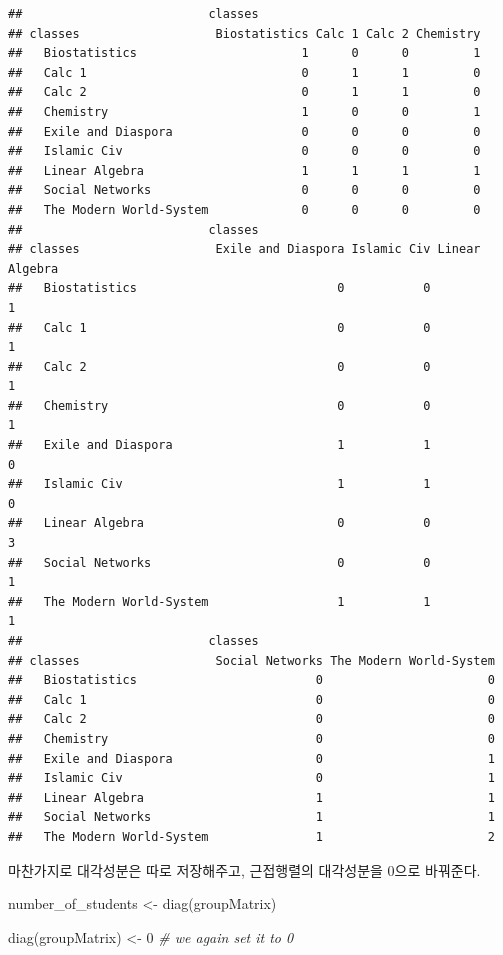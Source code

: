 \documentclass[
]{book}
\newenvironment{Shaded}{\begin{snugshade}}{\end{snugshade}}
\newcommand{\CommentTok}[1]{\textcolor[rgb]{0.56,0.35,0.01}{\textit{#1}}}
\newcommand{\DecValTok}[1]{\textcolor[rgb]{0.00,0.00,0.81}{#1}}
\newcommand{\FunctionTok}[1]{\textcolor[rgb]{0.00,0.00,0.00}{#1}}
\newcommand{\NormalTok}[1]{#1}
\newcommand{\OtherTok}[1]{\textcolor[rgb]{0.56,0.35,0.01}{#1}}
\begin{document}
\begin{verbatim}
##                          classes
## classes                   Biostatistics Calc 1 Calc 2 Chemistry
##   Biostatistics                       1      0      0         1
##   Calc 1                              0      1      1         0
##   Calc 2                              0      1      1         0
##   Chemistry                           1      0      0         1
##   Exile and Diaspora                  0      0      0         0
##   Islamic Civ                         0      0      0         0
##   Linear Algebra                      1      1      1         1
##   Social Networks                     0      0      0         0
##   The Modern World-System             0      0      0         0
##                          classes
## classes                   Exile and Diaspora Islamic Civ Linear Algebra
##   Biostatistics                            0           0              1
##   Calc 1                                   0           0              1
##   Calc 2                                   0           0              1
##   Chemistry                                0           0              1
##   Exile and Diaspora                       1           1              0
##   Islamic Civ                              1           1              0
##   Linear Algebra                           0           0              3
##   Social Networks                          0           0              1
##   The Modern World-System                  1           1              1
##                          classes
## classes                   Social Networks The Modern World-System
##   Biostatistics                         0                       0
##   Calc 1                                0                       0
##   Calc 2                                0                       0
##   Chemistry                             0                       0
##   Exile and Diaspora                    0                       1
##   Islamic Civ                           0                       1
##   Linear Algebra                        1                       1
##   Social Networks                       1                       1
##   The Modern World-System               1                       2
\end{verbatim}

마찬가지로 대각성분은 따로 저장해주고, 근접행렬의 대각성분을 0으로 바꿔준다.

\begin{Shaded}
\begin{Highlighting}[]
\NormalTok{number\_of\_students }\OtherTok{\textless{}{-}} \FunctionTok{diag}\NormalTok{(groupMatrix)}

\FunctionTok{diag}\NormalTok{(groupMatrix) }\OtherTok{\textless{}{-}} \DecValTok{0} \CommentTok{\# we again set it to 0}
\end{Highlighting}
\end{Shaded}
\end{document}
